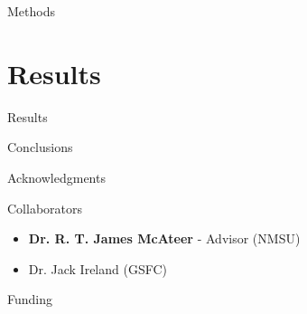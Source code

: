 \documentclass[notes]{beamer}
\begin{document}
\begin{frame}{Methods}{}
\end{frame}

\section{Results}
\begin{frame}{Results}{}
\end{frame}

\begin{frame}{Conclusions}{}
\end{frame}

\begin{frame}{Acknowledgments}
    \begin{block}{Collaborators}
        \begin{itemize}%
            \item \textbf{Dr. R. T. James McAteer} - Advisor (NMSU)
            \item Dr. Jack Ireland (GSFC)
        \end{itemize}
    \end{block}
    \begin{block}{Funding}
    \end{block}
\end{frame}

\begin{frame}{}{}
    \begin{minipage}{0.5\textwidth}
    \end{minipage}%
    \begin{minipage}{0.5\textwidth}
    \end{minipage}
\end{frame}
\end{document}
